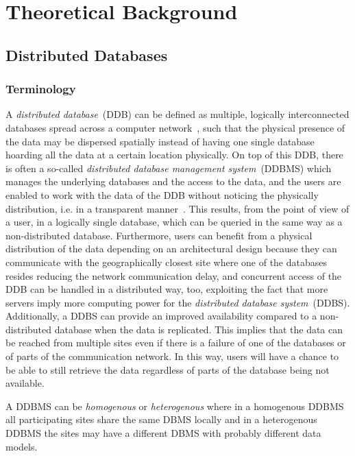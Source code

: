 
\section{Theoretical Background}
\label{sec:theo}

\subsection{Distributed Databases}
\label{sec:theo_ddb}

\subsubsection{Terminology}
\label{sec:theo_ddb_term}
A \emph{distributed database}~(DDB) can be defined as multiple, logically interconnected databases spread across a computer network~\cite[p.~4]{Ozsu1991}, such
that the physical presence of the data may be dispersed spatially instead of having one single database hoarding all the data at a certain location physically.
On top of this DDB, there is often a so-called \emph{distributed database management system}~(DDBMS) which manages the underlying databases and the access to 
the data, and the users are enabled to work with the data of the DDB without noticing the physically distribution, i.e. in a transparent 
manner~\cite[p.~4f.]{Ozsu1991}.
This results, from the point of view of a user, in a logically single database, which can be queried in the same way as a non-distributed database. 
Furthermore, users can benefit from a physical distribution of the data depending on an architectural design because they can communicate with the 
geographically closest site where one of the databases resides reducing the network communication delay, and concurrent access of the DDB can be handled in a 
distributed way, too, exploiting the fact that more servers imply more computing power for the \emph{distributed database system}~(DDBS). Additionally, a DDBS 
can provide an improved availability compared to a non-distributed database when the data is replicated. This implies that the data can be reached from 
multiple sites even if there is a failure of one of the databases or of parts of the communication network. In this way, users will have a chance to be able
to still retrieve the data regardless of parts of the database being not available.

A DDBMS can be \emph{homogenous} or \emph{heterogenous} where in a homogenous DDBMS all participating sites share the same DBMS locally and in a heterogenous
DDBMS the sites may have a different DBMS with probably different data models. 


